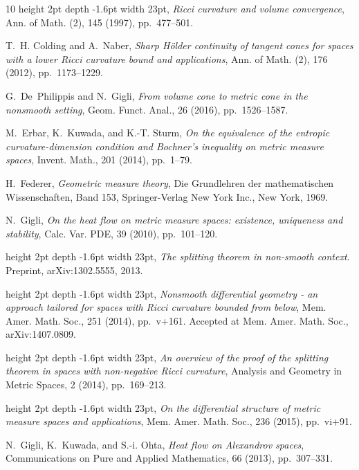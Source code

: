 \documentclass[reqno,11pt]{article}
\numberwithin{equation}{section}
\begin{document}
\begin{thebibliography}{10}
\leavevmode\vrule height 2pt depth -1.6pt width 23pt, {\em Ricci curvature and
  volume convergence}, Ann. of Math. (2), 145 (1997), pp.~477--501.

{\sc T.~H. Colding and A.~Naber}, {\em Sharp {H}\"older continuity of tangent
  cones for spaces with a lower {R}icci curvature bound and applications}, Ann.
  of Math. (2), 176 (2012), pp.~1173--1229.

{\sc G.~De~Philippis and N.~Gigli}, {\em From volume cone to metric cone in the
  nonsmooth setting}, Geom. Funct. Anal., 26 (2016), pp.~1526--1587.

{\sc M.~Erbar, K.~Kuwada, and K.-T. Sturm}, {\em On the equivalence of the
  entropic curvature-dimension condition and {B}ochner's inequality on metric
  measure spaces}, Invent. Math., 201 (2014), pp.~1--79.

{\sc H.~Federer}, {\em Geometric measure theory}, Die Grundlehren der
  mathematischen Wissenschaften, Band 153, Springer-Verlag New York Inc., New
  York, 1969.

{\sc N.~Gigli}, {\em On the heat flow on metric measure spaces: existence,
  uniqueness and stability}, Calc. Var. PDE, 39 (2010), pp.~101--120.

\leavevmode\vrule height 2pt depth -1.6pt width 23pt, {\em The splitting
  theorem in non-smooth context}.
\newblock Preprint, arXiv:1302.5555, 2013.

\leavevmode\vrule height 2pt depth -1.6pt width 23pt, {\em Nonsmooth
  differential geometry - an approach tailored for spaces with {R}icci
  curvature bounded from below}, Mem. Amer. Math. Soc., 251 (2014), pp.~v+161.
\newblock Accepted at Mem. Amer. Math. Soc., arXiv:1407.0809.

\leavevmode\vrule height 2pt depth -1.6pt width 23pt, {\em An overview of the
  proof of the splitting theorem in spaces with non-negative {R}icci
  curvature}, Analysis and Geometry in Metric Spaces, 2 (2014), pp.~169--213.

\leavevmode\vrule height 2pt depth -1.6pt width 23pt, {\em On the differential
  structure of metric measure spaces and applications}, Mem. Amer. Math. Soc.,
  236 (2015), pp.~vi+91.

{\sc N.~Gigli, K.~Kuwada, and S.-i. Ohta}, {\em Heat flow on {A}lexandrov
  spaces}, Communications on Pure and Applied Mathematics, 66 (2013),
  pp.~307--331.


\end{thebibliography}
\end{document}
